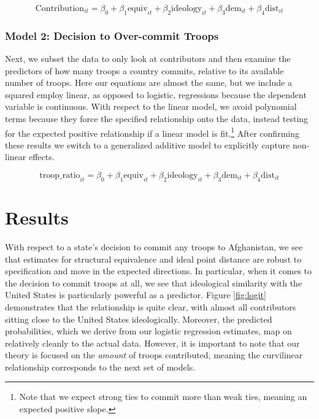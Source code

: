 \documentclass[12pt,letterpaper]{article}
\begin{document}
			\vspace{-2em}
			\begin{equation}
			\text{Contribution}_{it} = \beta_0 + \beta_1\text{equiv}_{it} +  \beta_2\text{ideology}_{it} + \beta_3\text{dem}_{it} + \beta_4\text{dist}_{it}
			\end{equation}
	
		\subsubsection{Model 2: Decision to Over-commit Troops}
			Next, we subset the data to only look at contributors and then examine the predictors of how many troops a country commits, relative to its available number of troops. Here our equations are almost the same, but we include a squared employ linear, as opposed to logistic, regressions because the dependent variable is continuous. With respect to the linear model, we avoid polynomial terms because they force the specified relationship onto the data, instead testing for the expected positive relationship if a linear model is fit.\footnote{Note that we expect strong ties to commit more than weak ties, meaning an expected positive slope.} After confirming these results we switch to a generalized additive model to explicitly capture non-linear effects.

			\vspace{-2em}
			\begin{equation*}
				\text{troop\_ratio}_{it} = \beta_0 + \beta_1\text{equiv}_{it} +
				\beta_2\text{ideology}_{it} + \beta_3\text{dem}_{it} + \beta_4\text{dist}_{it}
			\end{equation*}

\section{Results}
	With respect to a state's decision to commit any troops to Afghanistan, we see that estimates for structural equivalence and ideal point distance are robust to specification and move in the expected directions. In particular, when it comes to the decision to commit troops at all, we see that ideological similarity with the United States is particularly powerful as a predictor. Figure \ref{fig:logit} demonstrates that the relationship is quite clear, with almost all contributors sitting close to the United States ideologically. Moreover, the predicted probabilities, which we derive from our logistic regression estimates, map on relatively cleanly to the actual data. However, it is important to note that our theory is focused on the \textit{amount} of troops contributed, meaning the curvilinear relationship corresponds to the next set of models.
\end{document}
